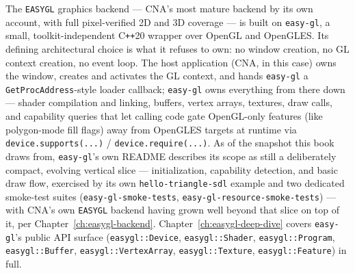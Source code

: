 The \texttt{EASYGL} graphics backend --- CNA's most mature backend by its own account, with
full pixel-verified 2D and 3D coverage --- is built on \texttt{easy-gl}, a small,
toolkit-independent C\texttt{++}20 wrapper over OpenGL and OpenGLES. Its defining
architectural choice is what it refuses to own: no window creation, no GL context creation,
no event loop. The host application (CNA, in this case) owns the window, creates and
activates the GL context, and hands \texttt{easy-gl} a \texttt{GetProcAddress}-style loader
callback; \texttt{easy-gl} owns everything from there down --- shader compilation and
linking, buffers, vertex arrays, textures, draw calls, and capability queries that let calling
code gate OpenGL-only features (like polygon-mode fill flags) away from OpenGLES targets at
runtime via \texttt{device.supports(...)} / \texttt{device.require(...)}. As of the snapshot this
book draws from, \texttt{easy-gl}'s own README describes its scope as still a deliberately
compact, evolving vertical slice --- initialization, capability detection, and basic draw flow,
exercised by its own \texttt{hello-triangle-sdl} example and two dedicated smoke-test suites
(\texttt{easy-gl-smoke-tests}, \texttt{easy-gl-resource-smoke-tests}) --- with CNA's own
\texttt{EASYGL} backend having grown well beyond that slice on top of it, per
Chapter~\ref{ch:easygl-backend}. Chapter~\ref{ch:easygl-deep-dive} covers \texttt{easy-gl}'s
public API surface (\texttt{easygl::Device}, \texttt{easygl::Shader}, \texttt{easygl::Program},
\texttt{easygl::Buffer}, \texttt{easygl::VertexArray}, \texttt{easygl::Texture},
\texttt{easygl::Feature}) in full.

